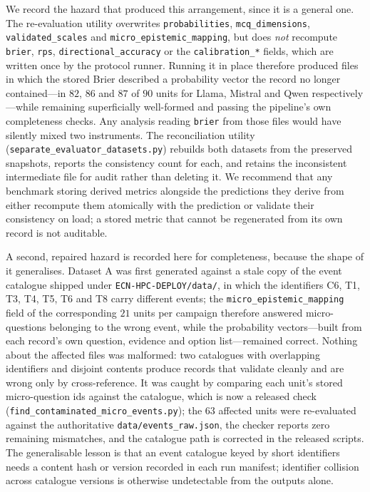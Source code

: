 \documentclass[11pt,journal,onecolumn]{IEEEtran}
\begin{document}
We record the hazard that produced this arrangement, since it is a general one. The re-evaluation utility overwrites \texttt{probabilities}, \texttt{mcq\_dimensions}, \texttt{validated\_scales} and \texttt{micro\_epistemic\_mapping}, but does \emph{not} recompute \texttt{brier}, \texttt{rps}, \texttt{directional\_accuracy} or the \texttt{calibration\_*} fields, which are written once by the protocol runner. Running it in place therefore produced files in which the stored Brier described a probability vector the record no longer contained---in $82$, $86$ and $87$ of $90$ units for Llama, Mistral and Qwen respectively---while remaining superficially well-formed and passing the pipeline's own completeness checks. Any analysis reading \texttt{brier} from those files would have silently mixed two instruments. The reconciliation utility (\texttt{separate\_evaluator\_datasets.py}) rebuilds both datasets from the preserved snapshots, reports the consistency count for each, and retains the inconsistent intermediate file for audit rather than deleting it. We recommend that any benchmark storing derived metrics alongside the predictions they derive from either recompute them atomically with the prediction or validate their consistency on load; a stored metric that cannot be regenerated from its own record is not auditable.

A second, repaired hazard is recorded here for completeness, because the shape of it generalises. Dataset A was first generated against a stale copy of the event catalogue shipped under \texttt{ECN-HPC-DEPLOY/data/}, in which the identifiers C6, T1, T3, T4, T5, T6 and T8 carry different events; the \texttt{micro\_epistemic\_mapping} field of the corresponding $21$ units per campaign therefore answered micro-questions belonging to the wrong event, while the probability vectors---built from each record's own question, evidence and option list---remained correct. Nothing about the affected files was malformed: two catalogues with overlapping identifiers and disjoint contents produce records that validate cleanly and are wrong only by cross-reference. It was caught by comparing each unit's stored micro-question ids against the catalogue, which is now a released check (\texttt{find\_contaminated\_micro\_events.py}); the $63$ affected units were re-evaluated against the authoritative \texttt{data/events\_raw.json}, the checker reports zero remaining mismatches, and the catalogue path is corrected in the released scripts. The generalisable lesson is that an event catalogue keyed by short identifiers needs a content hash or version recorded in each run manifest; identifier collision across catalogue versions is otherwise undetectable from the outputs alone.
\end{document}
